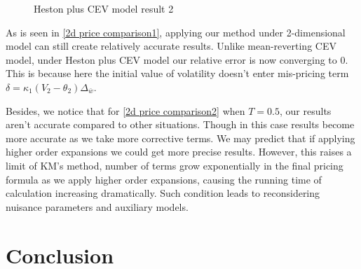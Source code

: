 \begin{figure}[ht]
  \centering
  \hfill
  \caption{Heston plus CEV model result 2}
\end{figure}

As is seen in \ref{2d price comparison1}, applying our method under 2-dimensional model can still create relatively accurate results. Unlike mean-reverting CEV model, under Heston plus CEV model our relative error is now converging to 0. This is because here the initial value of volatility doesn't enter mis-pricing term $\delta = \kappa_1(V_2-\theta_2) \Delta_{\bar{w}}$.

Besides, we notice that for \ref{2d price comparison2} when $T=0.5$, our results aren't accurate compared to other situations. Though in this case results become more accurate as we take more corrective terms. We may predict that if applying higher order expansions we could get more precise results. However, this raises a limit of KM's method, number of terms grow exponentially in the final pricing formula as we apply higher order expansions, causing the running time of calculation increasing dramatically. Such condition leads to reconsidering nuisance parameters and auxiliary models.

\chapter{Conclusion}

